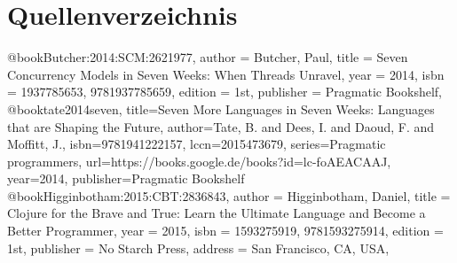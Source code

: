 \documentclass[11pt,a4paper]{report}
\begin{document}
  
  

  \setcounter{page}{3}
  
  \tableofcontents
  \listoffigures
  \clearpage


  
  
  
  

  \setcounter{page}{5}
  \chapter*{Quellenverzeichnis}
  @book{Butcher:2014:SCM:2621977,
 author = {Butcher, Paul},
 title = {Seven Concurrency Models in Seven Weeks: When Threads Unravel},
 year = {2014},
 isbn = {1937785653, 9781937785659},
 edition = {1st},
 publisher = {Pragmatic Bookshelf},
}
\\
@book{tate2014seven,
  title={Seven More Languages in Seven Weeks: Languages that are Shaping the Future},
  author={Tate, B. and Dees, I. and Daoud, F. and Moffitt, J.},
  isbn={9781941222157},
  lccn={2015473679},
  series={Pragmatic programmers},
  url={https://books.google.de/books?id=lc-foAEACAAJ},
  year={2014},
  publisher={Pragmatic Bookshelf}
}
\\
@book{Higginbotham:2015:CBT:2836843,
 author = {Higginbotham, Daniel},
 title = {Clojure for the Brave and True: Learn the Ultimate Language and Become a Better Programmer},
 year = {2015},
 isbn = {1593275919, 9781593275914},
 edition = {1st},
 publisher = {No Starch Press},
 address = {San Francisco, CA, USA},
} 
  \clearpage

  
\end{document}
